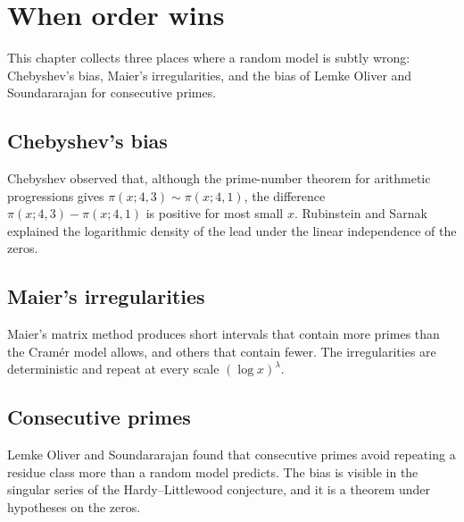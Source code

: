 \chapter{When order wins}\label{ch:oc-bias}

This chapter collects three places where a random model is subtly wrong: Chebyshev's bias, Maier's irregularities, and the bias of Lemke Oliver and Soundararajan for consecutive primes.

\section{Chebyshev's bias}

Chebyshev observed that, although the prime-number theorem for arithmetic progressions gives $\pi(x;4,3)\sim\pi(x;4,1)$, the difference $\pi(x;4,3)-\pi(x;4,1)$ is positive for most small $x$. Rubinstein and Sarnak explained the logarithmic density of the lead under the linear independence of the zeros.

\section{Maier's irregularities}

Maier's matrix method produces short intervals that contain more primes than the Cram\'er model allows, and others that contain fewer. The irregularities are deterministic and repeat at every scale $(\log x)^\lambda$.

\section{Consecutive primes}

Lemke Oliver and Soundararajan found that consecutive primes avoid repeating a residue class more than a random model predicts. The bias is visible in the singular series of the Hardy--Littlewood conjecture, and it is a theorem under hypotheses on the zeros.
